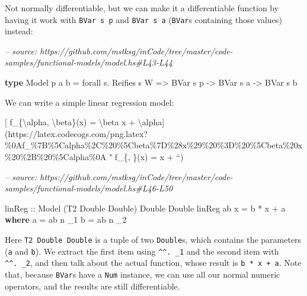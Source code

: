 \documentclass[]{article}
\newenvironment{Shaded}{}{}
\newcommand{\CommentTok}[1]{\textcolor[rgb]{0.38,0.63,0.69}{\textit{#1}}}
\newcommand{\DataTypeTok}[1]{\textcolor[rgb]{0.56,0.13,0.00}{#1}}
\newcommand{\FunctionTok}[1]{\textcolor[rgb]{0.02,0.16,0.49}{#1}}
\newcommand{\KeywordTok}[1]{\textcolor[rgb]{0.00,0.44,0.13}{\textbf{#1}}}
\newcommand{\NormalTok}[1]{#1}
\newcommand{\OtherTok}[1]{\textcolor[rgb]{0.00,0.44,0.13}{#1}}
\begin{document}
Not normally differentiable, but we can make it a differentiable function by
having it work with \texttt{BVar\ s\ p} and \texttt{BVar\ s\ a} (\texttt{BVar}s
containing those values) instead:

\begin{Shaded}
\begin{Highlighting}[]
\CommentTok{-- source: https://github.com/mstksg/inCode/tree/master/code-samples/functional-models/model.hs#L43-L44}

\KeywordTok{type} \DataTypeTok{Model}\NormalTok{ p a b }\FunctionTok{=}\NormalTok{ forall s}\FunctionTok{.} \DataTypeTok{Reifies}\NormalTok{ s }\DataTypeTok{W}
                 \OtherTok{=>} \DataTypeTok{BVar}\NormalTok{ s p }\OtherTok{->} \DataTypeTok{BVar}\NormalTok{ s a }\OtherTok{->} \DataTypeTok{BVar}\NormalTok{ s b}
\end{Highlighting}
\end{Shaded}

We can write a simple linear regression model:

{[} f\_\{\textbackslash{}alpha, \textbackslash{}beta\}(x) = \textbackslash{}beta
x +
\textbackslash{}alpha{]}(https://latex.codecogs.com/png.latex?\%0Af\_\%7B\%5Calpha\%2C\%20\%5Cbeta\%7D\%28x\%29\%20\%3D\%20\%5Cbeta\%20x\%20\%2B\%20\%5Calpha\%0A
" f\_\{\alpha, \beta\}(x) = \beta x + \alpha ``)

\begin{Shaded}
\begin{Highlighting}[]
\CommentTok{-- source: https://github.com/mstksg/inCode/tree/master/code-samples/functional-models/model.hs#L46-L50}

\OtherTok{linReg ::} \DataTypeTok{Model}\NormalTok{ (}\DataTypeTok{T2} \DataTypeTok{Double} \DataTypeTok{Double}\NormalTok{) }\DataTypeTok{Double} \DataTypeTok{Double}
\NormalTok{linReg ab x }\FunctionTok{=}\NormalTok{ b }\FunctionTok{*}\NormalTok{ x }\FunctionTok{+}\NormalTok{ a}
  \KeywordTok{where}
\NormalTok{    a }\FunctionTok{=}\NormalTok{ ab }\FunctionTok{^^.}\NormalTok{ _1}
\NormalTok{    b }\FunctionTok{=}\NormalTok{ ab }\FunctionTok{^^.}\NormalTok{ _2}
\end{Highlighting}
\end{Shaded}

Here \texttt{T2\ Double\ Double} is a tuple of two \texttt{Double}s, which
contains the parameters (\texttt{a} and \texttt{b}). We extract the first item
using \texttt{\^{}\^{}.\ \_1} and the second item with \texttt{\^{}\^{}.\ \_2},
and then talk about the actual function, whose result is \texttt{b\ *\ x\ +\ a}.
Note that, because \texttt{BVar}s have a \texttt{Num} instance, we can use all
our normal numeric operators, and the results are still differentiable.
\end{document}
